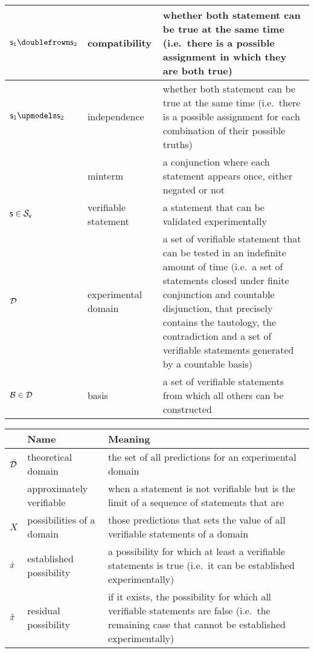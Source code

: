 \documentclass[11pt,letterpaper,fleqn]{memoir} %
\begin{document}
\begin{tabular}{p{} p{} p{}}
	$\stmt_1 \comp \stmt_2$ & compatibility & whether both statement can be true at the same time (i.e.~there is a possible assignment in which they are both true) \\
	\hline 
	$\stmt_1 \indep \stmt_2$ & independence & whether both statement can be true at the same time (i.e.~there is a possible assignment for each combination of their possible truths) \\
	\hline 
	& minterm & a conjunction where each statement appears once, either negated or not \\
	\hline 
	$\mathsf{s} \in \mathcal{S}_\textsf{v}$ & verifiable statement & a statement that can be validated experimentally\\ 
	\hline 
	$\mathcal{D}$ & experimental domain & a set of verifiable statement that can be tested in an indefinite amount of time (i.e.~a set of statements closed under finite conjunction and countable disjunction, that precisely contains the tautology, the contradiction and a set of verifiable statements generated by a countable basis) \\ 
	\hline 
	$\mathcal{B} \in \mathcal{D}$ & basis & a set of verifiable statements from which all others can be constructed\\ 
			
\end{tabular} 

\newpage

\begin{tabular}{p{} p{} p{}}
	& Name & Meaning  \\ 
	\hline 
	$\bar{\mathcal{D}}$ & theoretical domain & the set of all predictions for an experimental domain\\ 
	\hline 
	& approximately verifiable & when a statement is not verifiable but is the limit of a sequence of statements that are\\ 
	\hline 
	$X$ & possibilities of a domain & those predictions that sets the value of all verifiable statements of a domain\\ 
	\hline 
	$\dot{x}$ & established possibility & a possibility for which at least a verifiable statements is true (i.e.~it can be established experimentally)\\ 
	\hline 
	$\mathring{x}$ & residual possibility & if it exists, the possibility for which all verifiable statements are false (i.e.~the remaining case that cannot be established experimentally)\\ 
	
\end{tabular} 
\end{document}
